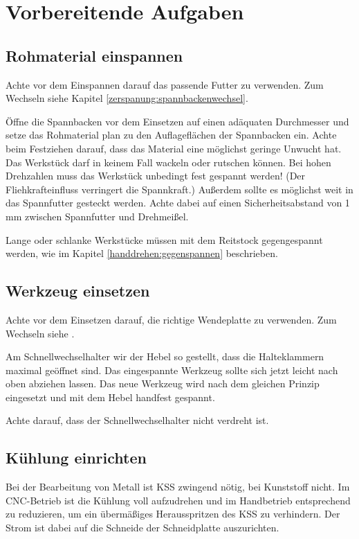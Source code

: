 \documentclass{\basedir/fablab-document}
\begin{document}
\clearpage

\newpage
\section{Vorbereitende Aufgaben}
\subsection{Rohmaterial einspannen}

Achte vor dem Einspannen darauf das passende Futter zu verwenden.
Zum Wechseln siehe Kapitel \ref{zerspanung:spannbackenwechsel}.

Öffne die Spannbacken vor dem Einsetzen auf einen adäquaten Durchmesser und setze das Rohmaterial
plan zu den Auflageflächen der Spannbacken ein.
Achte beim Festziehen darauf, dass das Material eine möglichst geringe Unwucht hat.
Das Werkstück darf in keinem Fall wackeln oder rutschen können.
Bei hohen Drehzahlen muss das Werkstück unbedingt fest gespannt werden!
(Der Fliehkrafteinfluss verringert die Spannkraft.)
Außerdem sollte es möglichst weit in das Spannfutter gesteckt werden.
Achte dabei auf einen Sicherheitsabstand von 1\,mm zwischen Spannfutter und Drehmeißel.

Lange oder schlanke Werkstücke müssen mit dem Reitstock gegengespannt werden,
wie im Kapitel \ref{handdrehen:gegenspannen} beschrieben.

\subsection{Werkzeug einsetzen} %
Achte vor dem Einsetzen darauf, die richtige Wendeplatte zu verwenden. Zum Wechseln siehe .

Am Schnellwechselhalter wir der Hebel so gestellt, dass die Halteklammern maximal geöffnet sind.
Das eingespannte Werkzeug sollte sich jetzt leicht nach oben abziehen lassen.
Das neue Werkzeug wird nach dem gleichen Prinzip eingesetzt und mit dem Hebel handfest gespannt.

Achte darauf, dass der Schnellwechselhalter nicht verdreht ist.

\subsection{Kühlung einrichten}

Bei der Bearbeitung von Metall ist KSS zwingend nötig, bei Kunststoff nicht.
Im CNC-Betrieb ist die Kühlung voll aufzudrehen und im Handbetrieb entsprechend zu reduzieren,
um ein übermäßiges Herausspritzen des KSS zu verhindern.
Der Strom ist dabei auf die Schneide der Schneidplatte auszurichten.
\end{document}

